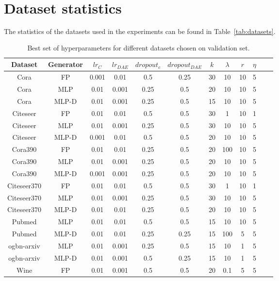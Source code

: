 \documentclass{article}
\begin{document}
\section{Dataset statistics}
The statistics of the datasets used in the experiments can be found in Table~\ref{tab:datasets}.



\begin{table*}
\footnotesize
\caption{Best set of hyperparameters for different datasets chosen on validation set.}
\label{tab:hyperparameters}
\begin{center}
\begin{tabular}{c|c|cccccccccc}
Dataset & Generator& $lr_{C}$ & $lr_{DAE}$ & $dropout_{c}$ & $dropout_{DAE}$ & $k$ & $\lambda$ & $r$ & $\eta$\\ \hline
Cora & FP & 0.001 & 0.01 & 0.5 & 0.25& 30 & 10 & 10 & 5\\
Cora & MLP & 0.01 & 0.001 & 0.25 & 0.5 & 20 & 10 & 10 & 5\\
Cora & MLP-D & 0.01 & 0.001 & 0.25 & 0.5 & 15 & 10 & 10 & 5\\ \hline
Citeseer & FP & 0.01 & 0.01 & 0.5 & 0.5 & 30 & 1 & 10 & 1\\
Citeseer & MLP & 0.01 & 0.001 & 0.25 & 0.5 & 30 & 10 & 10 & 5\\
Citeseer & MLP-D & 0.001 & 0.01 & 0.5 & 0.5 & 20 & 10 & 10 & 5\\ \hline
Cora390 & FP & 0.01 & 0.01 & 0.25 & 0.5 & 20 & 100 & 10 & 5\\
Cora390 & MLP & 0.01 & 0.001 & 0.25 & 0.5 & 20 & 10 & 10 & 5\\
Cora390 & MLP-D & 0.001 & 0.001 & 0.25 & 0.5 & 20 & 10 & 10 & 5\\ \hline
Citeseer370 & FP & 0.01 & 0.01 & 0.5 & 0.5 & 30 & 1 & 10 & 1\\
Citeseer370 & MLP & 0.01 & 0.001 & 0.25 & 0.5 & 30 & 10 & 10 & 5\\
Citeseer370 & MLP-D & 0.01 & 0.01 & 0.25 & 0.5 & 20 & 10 & 10 & 5\\ \hline
Pubmed & MLP & 0.01 & 0.01 & 0.5 & 0.5 & 15 & 10 & 10 & 5\\
Pubmed & MLP-D & 0.01 & 0.01 & 0.25 & 0.25 & 15 & 100 & 5 & 5\\ \hline
ogbn-arxiv & MLP & 0.01 & 0.001 & 0.25 & 0.5 & 15 & 10 & 1 & 5\\
ogbn-arxiv & MLP-D & 0.01 & 0.001 & 0.5 & 0.25 & 15 & 10 & 1 & 5\\ \hline
Wine & FP & 0.01 & 0.001 & 0.5 & 0.5 & 20 & 0.1 & 5 & 5\\

\end{tabular}
\end{center}
\end{table*}
\end{document}
